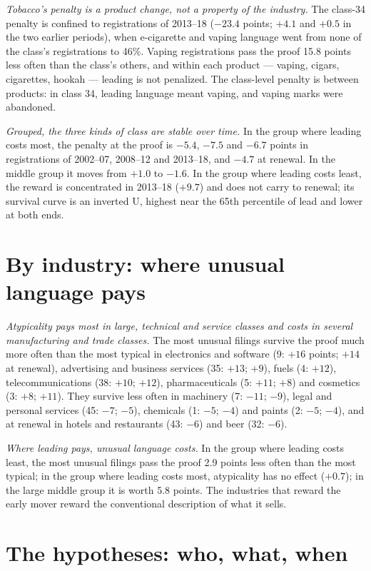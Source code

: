 \emph{Tobacco's penalty is a product change, not a property of the
industry.} The class-34 penalty is confined to registrations of 2013--18
($-23.4$ points; $+4.1$ and $+0.5$ in the two earlier periods), when
e-cigarette and vaping language went from none of the class's
registrations to 46\%. Vaping registrations pass the proof 15.8 points
less often than the class's others, and within each product ---
vaping, cigars, cigarettes, hookah --- leading is not penalized. The
class-level penalty is between products: in class 34, leading language
meant vaping, and vaping marks were abandoned.

\emph{Grouped, the three kinds of class are stable over time.} In the
group where leading costs most, the penalty at the proof is $-5.4$,
$-7.5$ and $-6.7$ points in registrations of 2002--07, 2008--12 and
2013--18, and $-4.7$ at renewal. In the middle group it moves from $+1.0$
to $-1.6$. In the group where leading costs least, the reward is
concentrated in 2013--18 ($+9.7$) and does not carry to renewal; its
survival curve is an inverted U, highest near the 65th percentile of lead
and lower at both ends.

\section*{By industry: where unusual language pays}

\emph{Atypicality pays most in large, technical and service classes and
costs in several manufacturing and trade classes.} The most unusual
filings survive the proof much more often than the most typical in
electronics and software (9: $+16$ points; $+14$ at renewal), advertising
and business services (35: $+13$; $+9$), fuels (4: $+12$), telecommunications
(38: $+10$; $+12$), pharmaceuticals (5: $+11$; $+8$) and cosmetics (3: $+8$;
$+11$). They survive less often in machinery (7: $-11$; $-9$), legal and
personal services (45: $-7$; $-5$), chemicals (1: $-5$; $-4$) and paints
(2: $-5$; $-4$), and at renewal in hotels and restaurants (43: $-6$) and
beer (32: $-6$).

\emph{Where leading pays, unusual language costs.} In the group where
leading costs least, the most unusual filings pass the proof 2.9 points
less often than the most typical; in the group where leading costs most,
atypicality has no effect ($+0.7$); in the large middle group it is worth
5.8 points. The industries that reward the early mover reward the
conventional description of what it sells.

\section*{The hypotheses: who, what, when}

